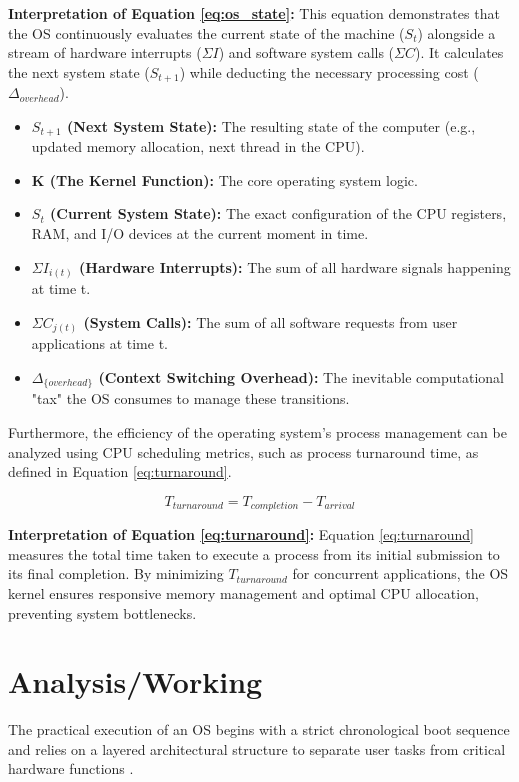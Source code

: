 \documentclass[11pt, a4paper]{article}
\begin{document}
\textbf{Interpretation of Equation \ref{eq:os_state}:} This equation demonstrates that the OS continuously evaluates the current state of the machine ($S_t$) alongside a stream of hardware interrupts ($\Sigma I$) and software system calls ($\Sigma C$). It calculates the next system state ($S_{t+1}$) while deducting the necessary processing cost ($\Delta_{overhead}$). 
\begin{itemize}
    \item \textbf{$S_{t+1}$ (Next System State):} The resulting state of the computer (e.g., updated memory allocation, next thread in the CPU).
    \item \textbf{K (The Kernel Function):} The core operating system logic.
    \item \textbf{$S_t$ (Current System State):} The exact configuration of the CPU registers, RAM, and I/O devices at the current moment in time.
    \item \textbf{$\Sigma I_{i(t)}$ (Hardware Interrupts):} The sum of all hardware signals happening at time t.
    \item \textbf{$\Sigma C_{j(t)}$ (System Calls):} The sum of all software requests from user applications at time t.
    \item \textbf{$\Delta_{\{overhead\}}$ (Context Switching Overhead):} The inevitable computational "tax" the OS consumes to manage these transitions.
\end{itemize}

Furthermore, the efficiency of the operating system's process management can be analyzed using CPU scheduling metrics, such as process turnaround time, as defined in Equation \ref{eq:turnaround}.

\begin{equation}
    T_{turnaround} = T_{completion} - T_{arrival}
    \label{eq:turnaround}
\end{equation}

\textbf{Interpretation of Equation \ref{eq:turnaround}:} Equation \ref{eq:turnaround} measures the total time taken to execute a process from its initial submission to its final completion. By minimizing $T_{turnaround}$ for concurrent applications, the OS kernel ensures responsive memory management and optimal CPU allocation, preventing system bottlenecks.

\section{Analysis/Working}
The practical execution of an OS begins with a strict chronological boot sequence and relies on a layered architectural structure to separate user tasks from critical hardware functions \cite{love}.
\end{document}
